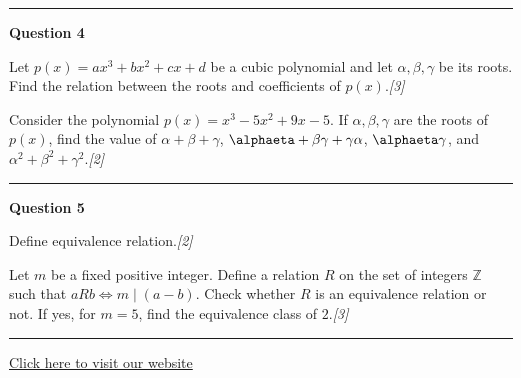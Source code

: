 \documentclass[11pt,a4paper]{article}
\newcommand{\pts}[1]{\hfill   \textit{[#1]}}
\begin{document}
\medskip\rule{\linewidth}{0.2pt}\medskip




\noindent   \textbf{Question 4}

\begin{parts}
  \item Let $p(x) = ax^3 + bx^2 + cx + d$ be a cubic polynomial and let $\alpha, \beta, \gamma$ be its roots. Find the relation between the roots and coefficients of $p(x)$.\pts{3}
  \item Consider the polynomial $p(x) = x^3 - 5x^2 + 9x - 5$. If $\alpha, \beta, \gamma$ are the roots of $p(x)$, find the value of $\alpha + \beta + \gamma$, $\alphaeta + \beta\gamma + \gamma\alpha$, $\alphaeta\gamma$, and $\alpha^2 + \beta^2 + \gamma^2$.\pts{2}
\end{parts}

\medskip\rule{\linewidth}{0.2pt}\medskip




\noindent   \textbf{Question 5}

\begin{parts}
  \item Define equivalence relation.\pts{2}
  \item Let $m$ be a fixed positive integer. Define a relation $R$ on the set of integers $\mathbb{Z}$ such that $a R b \iff m \mid (a - b)$. Check whether $R$ is an equivalence relation or not. If yes, for $m = 5$, find the equivalence class of $2$.\pts{3}
\end{parts}

\vfill\rule{\linewidth}{0.4pt}

\begin{center}\small\href{https://bhu-exam.vercel.app/}{Click here to visit our website}\end{center}
\end{document}
